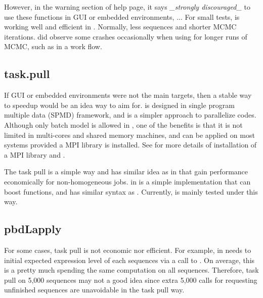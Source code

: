 However, in the warning section of  help page, it says
{\it \_strongly discouraged\_} to use these functions in GUI or embedded
environments, ...
For small tests,  is working well and efficient
in . Normally, less sequences and shorter MCMC iterations.
 did observe some crashes occasionally
when using  for longer runs of MCMC, such as in a
work flow.


\subsection[task.pull]{task.pull}
\label{sec:task.pull}

If GUI or embedded environments were not the main targets, then a stable way
to speedup  would be an idea way to aim for.
 is designed in single program multiple data (SPMD) framework,
and is a simpler approach to parallelize codes.
Although only batch model is allowed in ,
one of the benefits is that it is not limited in multi-cores and
shared memory machines, and can be applied on most systems provided a
MPI library is installed.
See \citet{Chen2012pbdMPIvignette} for more details of installation of a
MPI library and .

The task pull is a simple way and has similar idea as
 in  that gain
performance economically for non-homogeneous jobs.
 in  is a simple implementation that can boost
 functions, and has similar syntax as .
Currently,  is mainly tested under this way.


\subsection[pbdLapply]{pbdLapply}
\label{sec:pbdLapply}

For some cases, task pull is not economic nor efficient. For example, in
 needs to initial expected expression level of each sequences
via a call to . On average, this is a pretty much
spending the same computation on all sequences. Therefore, task pull on 5,000
sequences may not a good idea since extra 5,000 calls for requesting unfinished
sequences are unavoidable in the task pull way.

